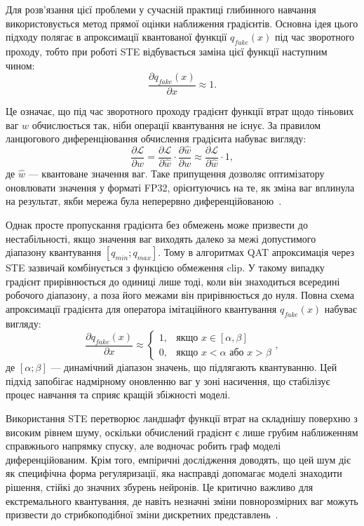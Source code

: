 \documentclass{pma-mthesis}
\begin{document}
Для розв'язання цієї проблеми у сучасній практиці глибинного навчання використовується метод прямої оцінки наближення градієнтів. Основна ідея цього підходу полягає в апроксимації квантованої функції $q_{fake}(x)$ під час зворотного проходу, тобто при роботі STE відбувається заміна цієї функції наступним чином:
\begin{equation}
    \frac{\partial q_{fake}(x)}{\partial x} \approx 1.
\end{equation}

Це означає, що під час зворотного проходу градієнт функції втрат щодо тіньових ваг $w$ обчислюється так, ніби операції квантування не існує. За правилом ланцюгового диференціювання обчислення градієнта набуває вигляду:
\begin{equation}
    \frac{\partial \mathcal{L}}{\partial w} = \frac{\partial \mathcal{L}}{\partial \hat{w}} \cdot \frac{\partial \hat{w}}{\partial w} \approx \frac{\partial \mathcal{L}}{\partial \hat{w}} \cdot 1,
\end{equation}
де $\hat{w}$ --- квантоване значення ваг. Таке припущення дозволяє оптимізатору оновлювати значення у форматі FP32, орієнтуючись на те, як зміна ваг вплинула на результат, якби мережа була неперервно диференційованою~\cite{bengio2013estimating}.

Однак просте пропускання градієнта без обмежень може призвести до нестабільності, якщо значення ваг виходять далеко за межі допустимого діапазону квантування $[q_{min}; q_{max}]$. Тому в алгоритмах QAT апроксимація через STE зазвичай комбінується з функцією обмеження $\text{clip}$. У такому випадку градієнт прирівнюється до одиниці лише тоді, коли він знаходиться всередині робочого діапазону, а поза його межами він прирівнюється до нуля. Повна схема апроксимації градієнта для оператора імітаційного квантування $q_{fake}(x)$ набуває вигляду:
\begin{equation}
    \frac{\partial q_{fake}(x)}{\partial x} \approx \begin{cases}
    1, & \text{якщо } x \in [\alpha, \beta] \\
    0, & \text{якщо } x < \alpha \text{ або } x > \beta
    \end{cases},
\end{equation}
де $[\alpha; \beta]$ --- динамічний діапазон значень, що підлягають квантуванню. Цей підхід запобігає надмірному оновленню ваг у зоні насичення, що стабілізує процес навчання та сприяє кращій збіжності моделі.

Використання STE перетворює ландшафт функції втрат на складнішу поверхню з високим рівнем шуму, оскільки обчислений градієнт є лише грубим наближенням справжнього напрямку спуску, але водночас робить граф моделі диференційованим. Крім того, емпіричні дослідження доводять, що цей шум діє як специфічна форма регуляризації, яка насправді допомагає моделі знаходити рішення, стійкі до значних збурень нейронів. Це критично важливо для екстремального квантування, де навіть незначні зміни повнорозмірних ваг можуть призвести до стрибкоподібної зміни дискретних представлень~\cite{bengio2013estimating}.
\end{document}
